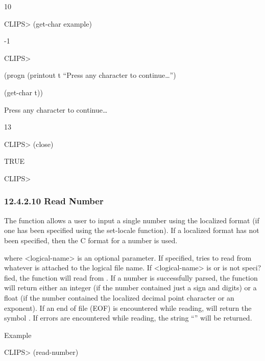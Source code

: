 \documentclass[letterpaper,10pt,english]{sphinxmanual}
\begin{document}
10

CLIPS\textgreater{} (get-char example)

-1

CLIPS\textgreater{}

(progn (printout t “Press any character to continue…”)

(get-char t))

Press any character to continue…

13

CLIPS\textgreater{} (close)

TRUE

CLIPS\textgreater{}


\subsubsection{12.4.2.10 Read Number}
\label{\detokenize{actions:read-number}}
The  function allows a user to input a single number
using the localized format (if one has been specified using the
set-locale function). If a localized format has not been specified, then
the C format for a number is used.


\begin{sphinxVerbatim}[commandchars=\\\{\}]
 \PYG{p}{[}\PYG{p}{]}
\end{sphinxVerbatim}

where \textless{}logical-name\textgreater{} is an optional parameter. If specified,
 tries to read from whatever is attached to the logical
file name. If \textless{}logical-name\textgreater{} is  or is not speci?fied, the function
will read from . If a number is successfully parsed, the
 function will return either an integer (if the number
contained just a sign and digits) or a float (if the number contained
the localized decimal point character or an exponent). If an end of file
(EOF) is encountered while reading,  will return the
symbol . If errors are encountered while reading, the string
“” will be returned.

Example

CLIPS\textgreater{} (read-number)
\end{document}
